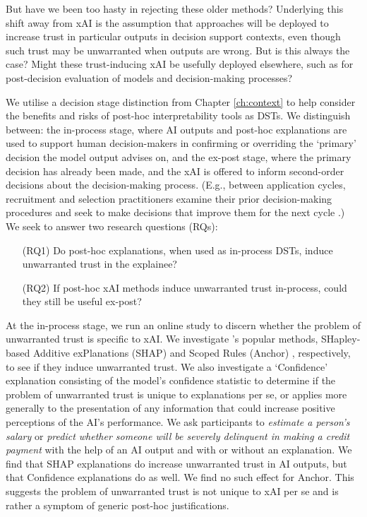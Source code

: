 But have we been too hasty in rejecting these older methods? Underlying this shift away from xAI is the assumption that approaches will be deployed to increase trust in particular outputs in decision support contexts, even though such trust may be unwarranted when outputs are wrong. But is this always the case? Might these trust-inducing xAI be usefully deployed elsewhere, such as for post-decision evaluation of models and decision-making processes?

We utilise a decision stage distinction from Chapter \ref{ch:context} to help consider the benefits and risks of post-hoc interpretability tools as DSTs. We distinguish between: the in-process stage, where AI outputs and post-hoc explanations are used to support human decision-makers in confirming or overriding the `primary' decision the model output advises on, and the ex-post stage, where the primary decision has already been made, and the xAI is offered to inform second-order decisions about the decision-making process. (E.g., between application cycles, recruitment and selection practitioners examine their prior decision-making procedures and seek to make decisions that improve them for the next cycle \cite{li2020hiring}.) We seek to answer two research questions (RQs):

\begin{enumerate}
    \item[(RQ1)] Do post-hoc explanations, when used as in-process DSTs, induce unwarranted trust in the explainee?
    \item[(RQ2)] If post-hoc xAI methods induce unwarranted trust in-process, could they still be useful ex-post?
\end{enumerate}

At the in-process stage, we run an online study to discern whether the problem of unwarranted trust is specific to xAI. We investigate \textcite{lundberg_unified_2017,ribeiro_anchors_2018}'s popular methods, SHapley-based Additive exPlanations (SHAP) \cite{lundberg_unified_2017} and Scoped Rules (Anchor) \cite{ribeiro_anchors_2018}, respectively, to see if they induce unwarranted trust. We also investigate a `Confidence' explanation consisting of the model's confidence statistic to determine if the problem of unwarranted trust is unique to explanations per se, or applies more generally to the presentation of any information that could increase positive perceptions of the AI's performance. We ask participants to \emph{estimate a person's salary} \cite{kohavi_scaling_1996} or \emph{predict whether someone will be severely delinquent in making a credit payment} \cite{GiveMeSomeCredit} with the help of an AI output and with or without an explanation. We find that SHAP explanations do increase unwarranted trust in AI outputs, but that Confidence explanations do as well. We find no such effect for Anchor. This suggests the problem of unwarranted trust is not unique to xAI per se and is rather a symptom of generic post-hoc justifications.

